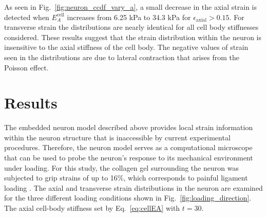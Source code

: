 \documentclass[]{interact}
\begin{document}
As seen in Fig.\ \ref{fig:neuron_ccdf_vary_a}, a small decrease in the axial strain is detected when $E_A^{\text{cell}}$ increases from 6.25 kPa to 34.3 kPa for $\epsilon_{\text{axial}} > 0.15$. For transverse strain the distributions are nearly identical for all cell body stiffnesses considered. These results suggest that the strain distribution within the neuron is insensitive to the axial stiffness of the cell body. The negative values of strain seen in the distributions are due to lateral contraction that arises from the Poisson effect.

\section{Results}
\label{sec:results}

The embedded neuron model described above provides local strain information within the neuron structure that is inaccessible by current experimental procedures. Therefore, the neuron model serves as a computational microscope that can be used to probe the  neuron's response to its mechanical environment under loading. For this study, the collagen gel surrounding the neuron was subjected to grip strains of up to 16$\%$, which corresponds to painful ligament loading \citep{Zhang:2016ga}. The axial and transverse strain distributions in the neuron are examined for the three different loading conditions shown in Fig.\ \ref{fig:loading_direction}. The axial cell-body stiffness set by Eq.\ \eqref{eq:cellEA} with $t=30$. 
\end{document}
